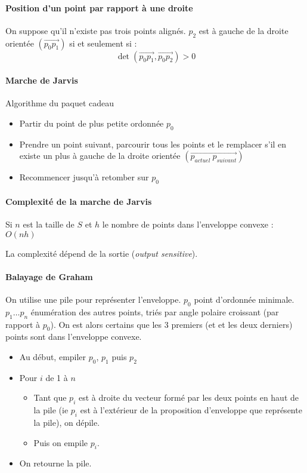 \documentclass[french]{article}
\begin{document}
\paragraph{Position d'un point par rapport à une droite} On suppose qu'il n'existe pas trois points alignés. $p_2$ est à gauche de la droite orientée $(\vec{p_0p_1})$ si et seulement si :
 \[ \det(\vec{p_0p_1}, \vec{p_0p_2}) > 0 \]
 
\paragraph{Marche de Jarvis} Algorithme du paquet cadeau
\begin{itemize}
	\item Partir du point de plus petite ordonnée $p_0$
	\item Prendre un point suivant, parcourir tous les points et le remplacer s'il en existe un plus à gauche de la droite orientée $(\vec{p_{actuel}~p_{suivant}})$
	\item Recommencer jusqu'à retomber sur $p_0$
\end{itemize}

\paragraph{Complexité de la marche de Jarvis} Si $n$ est la taille de $S$ et $h$ le nombre de points dans l'enveloppe convexe : $O(nh)$

La complexité dépend de la sortie (\emph{output sensitive}).


\paragraph{Balayage de Graham}
On utilise une pile pour représenter l'enveloppe.
$p_0$ point d'ordonnée minimale. $p_1\dots p_n$ énumération des autres points, triés par angle polaire croissant (par rapport à $p_0$).
On est alors certains que les 3 premiers (et et les deux derniers) points sont dans l'enveloppe convexe.

\begin{itemize}
\item Au début, empiler $p_0$, $p_1$ puis $p_2$
\item Pour $i$ de 1 à $n$\begin{itemize}
  \item Tant que $p_i$ est à droite du vecteur formé par les deux points en haut de la pile (ie $p_i$ est à l'extérieur de la proposition d'enveloppe que représente la pile), on dépile.
    \item Puis on empile $p_i$.
\end{itemize}
\item On retourne la pile.
\end{itemize}
\end{document}
